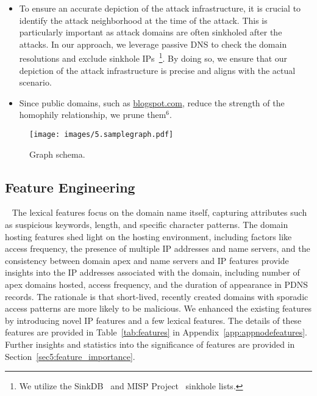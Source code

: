 \begin{itemize}[leftmargin=*]
\itemsep0em 
    \item To ensure an accurate depiction of the attack infrastructure, it is crucial to identify the attack neighborhood at the time of the attack. This is particularly important as attack domains are often sinkholed after the attacks. In our approach, we leverage passive DNS to check the domain resolutions and exclude sinkhole IPs~\footnote{We utilize the SinkDB~\cite{sinkDB:2024} and MISP Project~\cite{MISPSINKHOLE:2024} sinkhole lists.}. By doing so, we ensure that our depiction of the attack infrastructure is precise and aligns with the actual scenario.
        \item Since public domains, such as \url{blogspot.com}, reduce the strength of the homophily relationship, we prune them$^6$.
    \end{itemize}

\begin{figure}[t]
\centering
\texttt{[image: images/5.samplegraph.pdf]}
\caption{Graph schema.}
\label{fig:schema}
\end{figure}

\subsection{Feature Engineering}~\label{subsec:featureengineering}
The lexical features focus on the domain name itself, capturing attributes such as suspicious keywords, length, and specific character patterns. The domain hosting features shed light on the hosting environment, including factors like access frequency, the presence of multiple IP addresses and name servers, and the consistency between domain apex and name servers and IP features provide insights into the IP addresses associated with the domain, including number of apex domains hosted, access frequency, and the duration of appearance in PDNS records. The rationale is that short-lived, recently created domains with sporadic access patterns are more likely to be malicious. 
We enhanced the existing features by introducing novel IP features and a few lexical features. The details of these features are provided in Table~\ref{tab:features} in Appendix~\ref{app:appnodefeatures}.
Further insights and statistics into the significance of features are provided in Section~\ref{sec5:feature_importance}. 


